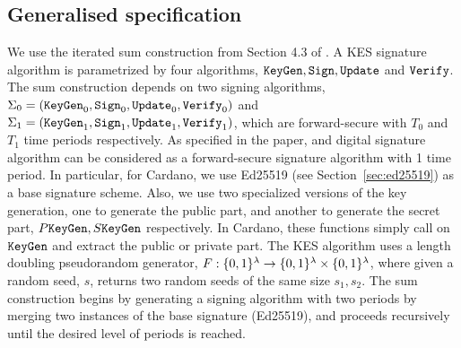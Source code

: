 \subsection{Generalised specification}
\newcommand{\update}{\texttt{Update}}
\newcommand{\pkeygen}{P\keygen}
\newcommand{\skeygen}{S\keygen}
\newcommand{\prf}{F}
\newcommand{\seed}{r}
\newcommand{\accept}{\texttt{true}}
\newcommand{\reject}{\texttt{false}}
We use the iterated sum construction from Section 4.3 of \cite{cryptoeprint:2001:034}.
A KES signature algorithm is parametrized by four algorithms, $\keygen, \sign, \update$ and $\texttt{Verify}$. The sum
construction depends on two signing algorithms, $\Sigma_0 = (\keygen_0, \sign_0, \allowbreak\update_0, \verify_0)$
and $\Sigma_1 = (\keygen_1, \sign_1, \update_1, \verify_1)$, which are forward-secure with $T_0$ and $T_1$ time
periods respectively. As specified in the paper, and digital signature algorithm can be considered as a
forward-secure signature algorithm with 1 time period. In particular, for Cardano, we use Ed25519 (see
Section~\ref{sec:ed25519}) as a base signature scheme. Also, we use two specialized versions of the key generation,
one to generate the public
part, and another to generate the secret part, $\pkeygen, \skeygen$ respectively. In Cardano,
these functions simply call on $\texttt{KeyGen}$ and extract the public or private part. The KES algorithm
uses a length doubling pseudorandom generator, $\prf:\{0,1\}^{\secparam}\rightarrow\{0,1\}^{\secparam}\times\{0,
1\}^{\secparam}$, where given a random seed, $s$, returns two random seeds of the same size $s_1, s_2$. The sum
construction begins by generating a signing algorithm with two periods by merging two instances of the base signature
(Ed25519), and proceeds recursively until the desired level of periods is reached.
